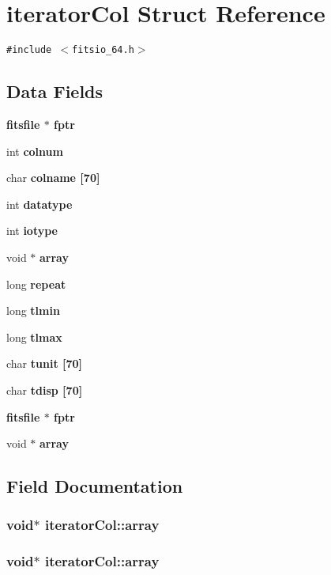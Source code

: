 \section{iterator\-Col Struct Reference}
\label{structiteratorCol}
{\tt \#include $<$fitsio\_\-64.h$>$}

\subsection*{Data Fields}
\begin{CompactItemize}
\item 
\bf{fitsfile} $\ast$ \bf{fptr}
\item 
int \bf{colnum}
\item 
char \bf{colname} [70]
\item 
int \bf{datatype}
\item 
int \bf{iotype}
\item 
void $\ast$ \bf{array}
\item 
long \bf{repeat}
\item 
long \bf{tlmin}
\item 
long \bf{tlmax}
\item 
char \bf{tunit} [70]
\item 
char \bf{tdisp} [70]
\item 
\bf{fitsfile} $\ast$ \bf{fptr}
\item 
void $\ast$ \bf{array}
\end{CompactItemize}


\subsection{Field Documentation}
\subsubsection{\setlength{\rightskip}{0pt plus 5cm}void$\ast$ \bf{iterator\-Col::array}}\label{structiteratorCol_158b5f9123106f24eaca2957e5af26f4}


\subsubsection{\setlength{\rightskip}{0pt plus 5cm}void$\ast$ \bf{iterator\-Col::array}}\label{structiteratorCol_158b5f9123106f24eaca2957e5af26f4}


